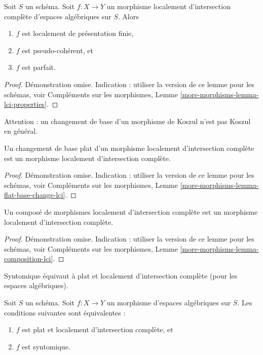 \begin{lemma}
\label{lemma-lci-properties}
Soit $S$ un schéma. Soit $f : X \to Y$ un morphisme localement d'intersection
complète d'espaces algébriques sur $S$. Alors
\begin{enumerate}
\item $f$ est localement de présentation finie,
\item $f$ est pseudo-cohérent, et
\item $f$ est parfait.
\end{enumerate}
\end{lemma}

\begin{proof}
Démonstration omise. Indication : utiliser la version de ce lemme pour les schémas, voir
Compléments sur les morphismes,
Lemme \ref{more-morphisms-lemma-lci-properties}.
\end{proof}

\noindent
Attention : un changement de base d'un morphisme de Koszul n'est pas Koszul en général.

\begin{lemma}
\label{lemma-flat-base-change-lci}
Un changement de base plat d'un morphisme localement d'intersection complète est un
morphisme localement d'intersection complète.
\end{lemma}

\begin{proof}
Démonstration omise. Indication : utiliser la version de ce lemme pour les schémas, voir
Compléments sur les morphismes,
Lemme \ref{more-morphisms-lemma-flat-base-change-lci}.
\end{proof}

\begin{lemma}
\label{lemma-composition-lci}
Un composé de morphismes localement d'intersection complète est un
morphisme localement d'intersection complète.
\end{lemma}

\begin{proof}
Démonstration omise. Indication : utiliser la version de ce lemme pour les schémas, voir
Compléments sur les morphismes,
Lemme \ref{more-morphisms-lemma-composition-lci}.
\end{proof}

\begin{lemma}
\label{lemma-flat-lci}
\begin{slogan}
Syntomique équivaut à plat et localement d'intersection complète (pour les espaces algébriques).
\end{slogan}
Soit $S$ un schéma.
Soit $f : X \to Y$ un morphisme d'espaces algébriques sur $S$.
Les conditions suivantes sont équivalentes :
\begin{enumerate}
\item $f$ est plat et localement d'intersection complète, et
\item $f$ est syntomique.
\end{enumerate}
\end{lemma}

